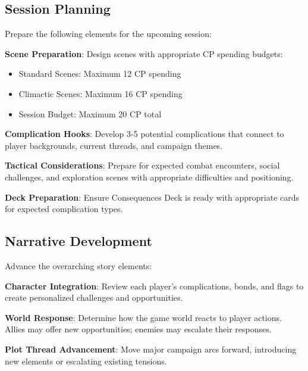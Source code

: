 \subsection{Session Planning}

Prepare the following elements for the upcoming session:

\textbf{Scene Preparation}: Design scenes with appropriate CP spending budgets:
\begin{itemize}
    \item Standard Scenes: Maximum 12 CP spending
    \item Climactic Scenes: Maximum 16 CP spending
    \item Session Budget: Maximum 20 CP total
\end{itemize}

\textbf{Complication Hooks}: Develop 3-5 potential complications that connect to player backgrounds, current threads, and campaign themes.

\textbf{Tactical Considerations}: Prepare for expected combat encounters, social challenges, and exploration scenes with appropriate difficulties and positioning.

\textbf{Deck Preparation}: Ensure Consequences Deck is ready with appropriate cards for expected complication types.

\subsection{Narrative Development}

Advance the overarching story elements:

\textbf{Character Integration}: Review each player's complications, bonds, and flags to create personalized challenges and opportunities.

\textbf{World Response}: Determine how the game world reacts to player actions. Allies may offer new opportunities; enemies may escalate their responses.

\textbf{Plot Thread Advancement}: Move major campaign arcs forward, introducing new elements or escalating existing tensions.

